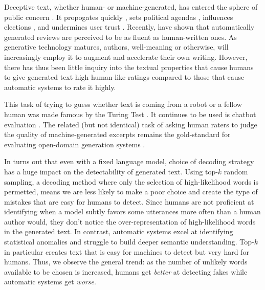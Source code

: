 Deceptive text, whether human- or machine-generated, has entered the sphere of public concern \citep{cooke2018fake}.
It propogates quickly \citep{vosoughi2018spread}, sets political agendas \citep{vargo2018agenda}, influences elections \citep{allcott2017social}, and undermines user trust \cite{wang2012serf, song2015crowdtarget}.
Recently, \citet{adelani2020generating} have shown that automatically generated reviews are perceived to be as fluent as human-written ones.
As generative technology matures, authors, well-meaning or otherwise, will increasingly employ it to augment and accelerate their own writing.
However, there has thus been little inquiry into the textual properties that cause humans to give generated text high human-like ratings compared to those that cause automatic systems to rate it highly.

This task of trying to guess whether text is coming from a robot or a fellow human was made famous by the Turing Test \citep{turing1950computing}.
It continues to be used is chatbot evaluation \citep{lowe2017towards}.
The related (but not identical) task of asking human raters to judge the quality of machine-generated excerpts remains the gold-standard for evaluating open-domain generation systems \citep{van2019best}.

In turns out that even with a fixed language model, choice of decoding strategy has a huge impact on the detectability of generated text.
Using top-$k$ random sampling, a decoding method where only the selection of high-likelihood words is permetted, means we are less likely to make a poor choice and create the type of mistakes that are easy for humans to detect.
Since humans are not proficient at identifying when a model subtly favors some utterances more often than a human author would, they don't notice the over-representation of high-likelihood words in the generated text.
In contrast, automatic systems excel at identifying statistical anomalies and struggle to build deeper semantic understanding.
Top-$k$ in particular creates text that is easy for machines to detect but very hard for humans.
Thus, we observe the general trend: as the number of unlikely words available to be chosen is increased, humans get {\em better} at detecting fakes while automatic systems get {\em worse}.

